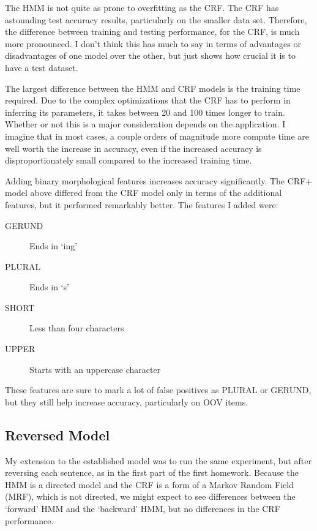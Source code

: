 \documentclass[10pt]{article}\usepackage{graphicx, color}
\begin{document}
The HMM is not quite as prone to overfitting as the CRF. The CRF has astounding test accuracy results, particularly on the smaller data set. Therefore, the difference between training and testing performance, for the CRF, is much more pronounced. I don't think this has much to say in terms of advantages or disadvantages of one model over the other, but just shows how crucial it is to have a test dataset.

The largest difference between the HMM and CRF models is the training time required. Due to the complex optimizations that the CRF has to perform in inferring its parameters, it takes between 20 and 100 times longer to train. Whether or not this is a major consideration depends on the application. I imagine that in most cases, a couple orders of magnitude more compute time are well worth the increase in accuracy, even if the increased accuracy is disproportionately small compared to the increased training time.

Adding binary morphological features increases accuracy significantly. The CRF+ model above differed from the CRF model only in terms of the additional features, but it performed remarkably better. The features I added were:
\begin{description}
  \item[GERUND] Ends in `ing'
  \item[PLURAL] Ends in `s'
  \item[SHORT] Less than four characters
  \item[UPPER] Starts with an uppercase character
\end{description}
These features are sure to mark a lot of false positives as PLURAL or GERUND, but they still help increase accuracy, particularly on OOV items.

\subsection{Reversed Model}

My extension to the established model was to run the same experiment, but after reversing each sentence, as in the first part of the first homework.
Because the HMM is a directed model and the CRF is a form of a Markov Random Field (MRF), which is not directed, we might expect to see differences between the `forward' HMM and the `backward' HMM, but no differences in the CRF performance.
\end{document}
